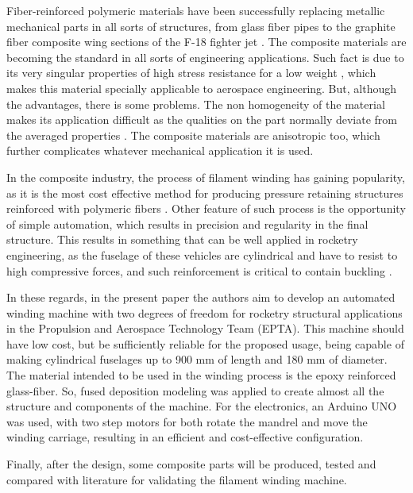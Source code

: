 \documentclass[10pt,fleqn,a4paper,twoside]{article}
\begin{document}
Fiber-reinforced polymeric materials have been successfully replacing metallic mechanical parts in all sorts of structures, from glass fiber pipes to the graphite fiber composite wing sections of the F-18 fighter jet \citep{vari_bobi}. The composite materials are becoming the standard in all sorts of engineering applications. Such fact is due to its very singular properties of high stress resistance for a low weight \citep{bobinamento}, which makes this material specially applicable to aerospace engineering.
But, although the advantages, there is some problems. The non homogeneity of the material makes its application difficult as the qualities on the part normally deviate from the averaged properties \citep{utilizacaoi}. The composite materials are anisotropic too, which further complicates whatever mechanical application it is used.      

In the composite industry, the process of filament winding has gaining popularity, as it is the most cost effective method for producing pressure retaining structures reinforced with polymeric fibers \citep{influence_tension}. Other feature of such process is the opportunity of simple automation, which results in precision and regularity in the final structure. This results in something that can be well applied in rocketry engineering, as the fuselage of these vehicles are cylindrical and have to resist to high compressive forces, and such reinforcement is critical to contain buckling \citep{rocket_tube}. 

In these regards, in the present paper the authors aim to develop an automated winding machine with two degrees of freedom for rocketry structural applications in the Propulsion and Aerospace Technology Team (EPTA). 
This machine should have low cost, but be sufficiently reliable for the proposed usage, being capable of making cylindrical fuselages up to 900 mm of length and 180 mm of diameter. The material intended to be used in the winding process is the epoxy reinforced glass-fiber. So, fused deposition modeling was applied to create almost all the structure and components of the machine. For the electronics, an Arduino UNO was used, with two step motors for both rotate the mandrel and move the winding carriage, resulting in an efficient and cost-effective configuration. 

Finally, after the design, some composite parts will be produced, tested and compared with literature \citep{ensaio_artigo} for validating the filament winding machine.
\end{document}
